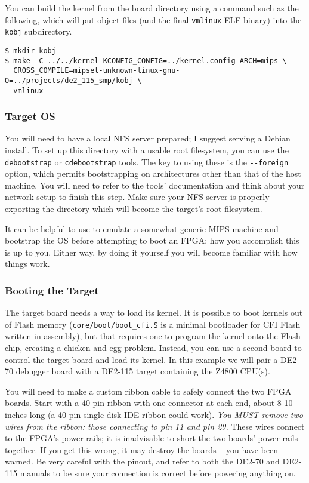 You can build the kernel from the board directory using a command such as the
following, which will put object files (and the final \verb+vmlinux+ ELF
binary) into the \verb+kobj+ subdirectory.

\begin{verbatim}
$ mkdir kobj
$ make -C ../../kernel KCONFIG_CONFIG=../kernel.config ARCH=mips \
  CROSS_COMPILE=mipsel-unknown-linux-gnu- O=../projects/de2_115_smp/kobj \
  vmlinux
\end{verbatim}

\subsubsection{Target OS}

You will need to have a local NFS server prepared; I suggest serving a Debian
install. To set up this directory with a usable root filesystem, you can use
the \verb+debootstrap+ or \verb+cdebootstrap+ tools. The key to using these is
the \verb+--foreign+ option, which permits bootstrapping on architectures other
than that of the host machine. You will need to refer to the tools'
documentation and think about your network setup to finish this step. Make sure
your NFS server is properly exporting the directory which will become the
target's root filesystem.

It can be helpful to use  to
emulate a somewhat generic MIPS machine and bootstrap the OS before attempting
to boot an FPGA; how you accomplish this is up to you. Either way, by doing it
yourself you will become familiar with how things work.

\subsubsection{Booting the Target}

The target board needs a way to load its kernel. It is possible to boot kernels
out of Flash memory (\verb+core/boot/boot_cfi.S+ is a minimal bootloader for
CFI Flash written in assembly), but that requires one to program the kernel
onto the Flash chip, creating a chicken-and-egg problem. Instead, you can use a
second board to control the target board and load its kernel. In this example
we will pair a DE2-70 debugger board with a DE2-115 target containing the Z4800
CPU(s).

You will need to make a custom ribbon cable to safely connect the two FPGA
boards. Start with a 40-pin ribbon with one connector at each end, about 8-10
inches long (a 40-pin single-disk IDE ribbon could work). \emph{You MUST remove
two wires from the ribbon: those connecting to pin 11 and pin 29.} These wires
connect to the FPGA's power rails; it is inadvisable to short the two boards'
power rails together. If you get this wrong, it may destroy the boards -- you
have been warned. Be very careful with the pinout, and refer to both the DE2-70
and DE2-115 manuals to be sure your connection is correct before powering
anything on.

